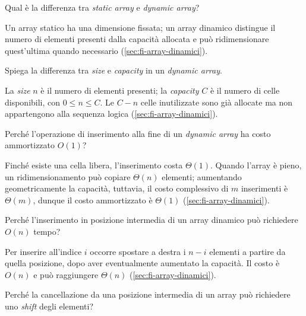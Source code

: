 \begin{exercise}
\label{ex:fi-esercizi-strutture-dati-statico-dinamico}
Qual è la differenza tra \emph{static array} e \emph{dynamic array}?
\end{exercise}

Un array statico ha una dimensione fissata; un array dinamico distingue il
numero di elementi presenti dalla capacità allocata e può ridimensionare
quest'ultima quando necessario (\cref{sec:fi-array-dinamici}).

\begin{exercise}
\label{ex:fi-esercizi-strutture-dati-size-capacity}
Spiega la differenza tra \emph{size} e \emph{capacity} in un \emph{dynamic
array}.
\end{exercise}

La \emph{size} \(n\) è il numero di elementi presenti; la \emph{capacity} \(C\)
è il numero di celle disponibili, con \(0\le n\le C\). Le \(C-n\) celle
inutilizzate sono già allocate ma non appartengono alla sequenza logica
(\cref{sec:fi-array-dinamici}).

\begin{exercise}
\label{ex:fi-esercizi-strutture-dati-append-ammortizzato}
Perché l'operazione di inserimento alla fine di un \emph{dynamic array} ha costo
ammortizzato \(O(1)\)?
\end{exercise}

Finché esiste una cella libera, l'inserimento costa \(\Theta(1)\). Quando
l'array è pieno, un ridimensionamento può copiare \(\Theta(n)\) elementi;
aumentando geometricamente la capacità, tuttavia, il costo complessivo di \(m\)
inserimenti è \(\Theta(m)\), dunque il costo ammortizzato è \(\Theta(1)\)
(\cref{sec:fi-array-dinamici}).

\begin{exercise}
\label{ex:fi-esercizi-strutture-dati-array-inserimento-intermedio}
Perché l'inserimento in posizione intermedia di un array dinamico può richiedere \(O(n)\)
tempo?
\end{exercise}

Per inserire all'indice \(i\) occorre spostare a destra i \(n-i\) elementi
a partire da quella posizione, dopo aver eventualmente aumentato la capacità.
Il costo è \(O(n)\) e può raggiungere \(\Theta(n)\)
(\cref{sec:fi-array-dinamici}).

\begin{exercise}
\label{ex:fi-esercizi-strutture-dati-array-cancellazione-shift}
Perché la cancellazione da una posizione intermedia di un array può richiedere
uno \emph{shift} degli elementi?
\end{exercise}

